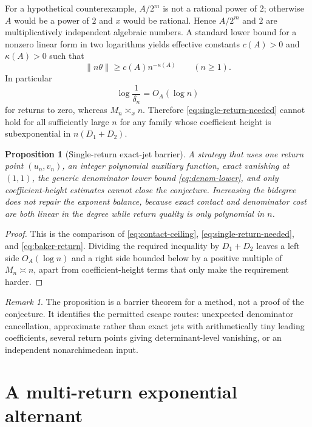 \documentclass[11pt]{article}
\newtheorem{proposition}[theorem]{Proposition}
\theoremstyle{definition}
\theoremstyle{remark}
\newtheorem{remark}[theorem]{Remark}
\begin{document}
For a hypothetical counterexample, $A/2^m$ is not a rational power of $2$; otherwise $A$ would be a power of $2$ and $x$ would be rational. Hence $A/2^m$ and $2$ are multiplicatively independent algebraic numbers. A standard lower bound for a nonzero linear form in two logarithms yields effective constants $c(A)>0$ and $\kappa(A)>0$ such that
\begin{equation}\label{eq:baker-return}
 \|n\theta\|\ge c(A)n^{-\kappa(A)}
 \qquad(n\ge1).
\end{equation}
In particular
\[
 \log\frac1{\delta_n}=O_A(\log n)
\]
for returns to zero, whereas $M_n\asymp_x n$. Therefore \eqref{eq:single-return-needed} cannot hold for all sufficiently large $n$ for any family whose coefficient height is subexponential in $n(D_1+D_2)$.

\begin{proposition}[Single-return exact-jet barrier]\label{prop:single-jet-barrier}
A strategy that uses one return point $(u_n,v_n)$, an integer polynomial auxiliary function, exact vanishing at $(1,1)$, the generic denominator lower bound \eqref{eq:denom-lower}, and only coefficient-height estimates cannot close the conjecture. Increasing the bidegree does not repair the exponent balance, because exact contact and denominator cost are both linear in the degree while return quality is only polynomial in $n$.
\end{proposition}

\begin{proof}
This is the comparison of \eqref{eq:contact-ceiling}, \eqref{eq:single-return-needed}, and \eqref{eq:baker-return}. Dividing the required inequality by $D_1+D_2$ leaves a left side $O_A(\log n)$ and a right side bounded below by a positive multiple of $M_n\asymp n$, apart from coefficient-height terms that only make the requirement harder.
\end{proof}

\begin{remark}
The proposition is a barrier theorem for a method, not a proof of the conjecture. It identifies the permitted escape routes: unexpected denominator cancellation, approximate rather than exact jets with arithmetically tiny leading coefficients, several return points giving determinant-level vanishing, or an independent nonarchimedean input.
\end{remark}

\section{A multi-return exponential alternant}\label{sec:alternant}
\end{document}
